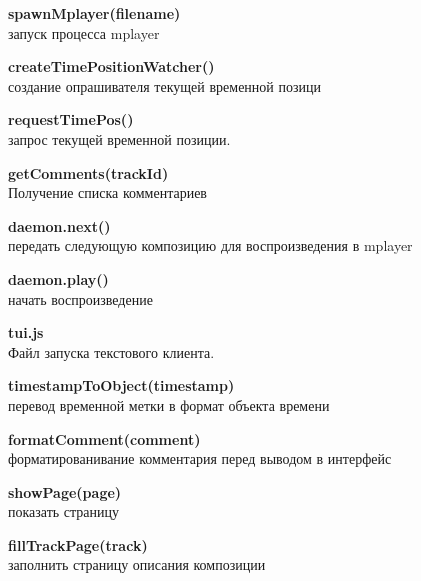 \begin{itemize}
\begin{item}
    \begin{itemize}
        \begin{item}
          \textbf{spawnMplayer(filename) } \\ запуск процесса mplayer
        \end{item}
        \begin{item}
          \textbf{ createTimePositionWatcher() } 
          \\ создание опрашивателя текущей временной позици
        \end{item}
        \begin{item}
          \textbf{ requestTimePos() } 
          \\ запрос текущей временной позиции. 
        \end{item}
        \begin{item}
          \textbf{getComments(trackId) } \\ Получение списка комментариев
        \end{item}
        \begin{item}
          \textbf{ daemon.next()} 
          \\ передать следующую композицию для воспроизведения в mplayer
        \end{item}
        \begin{item}
          \textbf{ daemon.play()} \\ начать воспроизведение
        \end{item}
    \end{itemize}

  \end{item}
  \begin{item}

    \textbf{tui.js} \\
    Файл запуска текстового клиента. 
    
    \begin{itemize}
        \begin{item}
          \textbf{timestampToObject(timestamp) } \\ перевод временной
          метки в формат объекта времени
        \end{item}
        \begin{item}
          \textbf{ formatComment(comment) } \\ форматированивание
          комментария перед выводом в интерфейс
        \end{item}
        \begin{item}
          \textbf{ showPage(page) } \\ показать страницу
        \end{item}
        \begin{item}
          \textbf{ fillTrackPage(track) } \\ заполнить страницу
          описания композиции
        \end{item}
    \end{itemize}

  \end{item}

\end{itemize}

